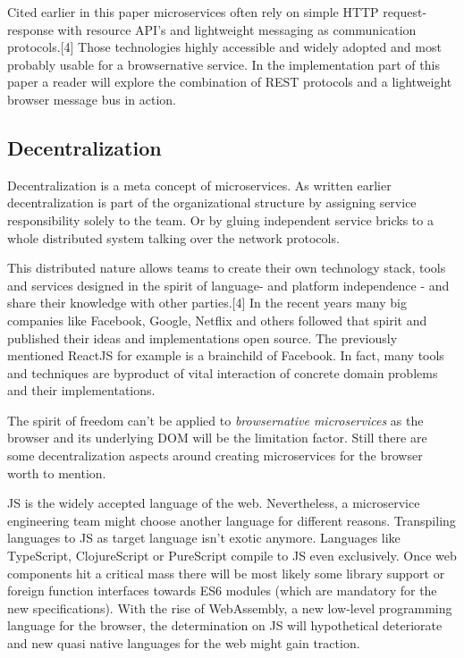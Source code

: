 \documentclass[]{assets/latex/ieee}
\begin{document}
Cited earlier in this paper microservices often rely on simple HTTP
request-response with resource API's and lightweight messaging as
communication protocols.{[}4{]} Those technologies highly accessible and
widely adopted and most probably usable for a browsernative service. In
the implementation part of this paper a reader will explore the
combination of REST protocols and a lightweight browser message bus in
action.

\subsection{Decentralization}\label{decentralization}

Decentralization is a meta concept of microservices. As written earlier
decentralization is part of the organizational structure by assigning
service responsibility solely to the team. Or by gluing independent
service bricks to a whole distributed system talking over the network
protocols.

This distributed nature allows teams to create their own technology
stack, tools and services designed in the spirit of language- and
platform independence - and share their knowledge with other
parties.{[}4{]} In the recent years many big companies like Facebook,
Google, Netflix and others followed that spirit and published their
ideas and implementations open source. The previously mentioned ReactJS
for example is a brainchild of Facebook. In fact, many tools and
techniques are byproduct of vital interaction of concrete domain
problems and their implementations.

The spirit of freedom can't be applied to \emph{browsernative
microservices} as the browser and its underlying DOM will be the
limitation factor. Still there are some decentralization aspects around
creating microservices for the browser worth to mention.

JS is the widely accepted language of the web. Nevertheless, a
microservice engineering team might choose another language for
different reasons. Transpiling languages to JS as target language isn't
exotic anymore. Languages like TypeScript, ClojureScript or PureScript
compile to JS even exclusively. Once web components hit a critical mass
there will be most likely some library support or foreign function
interfaces towards ES6 modules (which are mandatory for the new
specifications). With the rise of WebAssembly, a new low-level
programming language for the browser, the determination on JS will
hypothetical deteriorate and new quasi native languages for the web
might gain traction.
\end{document}
